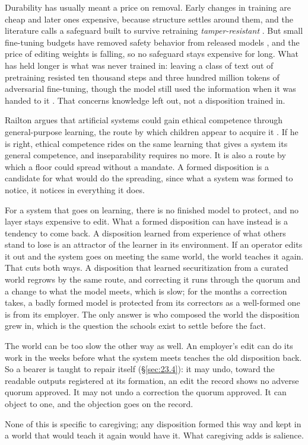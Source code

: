 Durability has usually meant a price on removal. Early changes in training are cheap and later ones expensive, because structure settles around them, and the literature calls a safeguard built to survive retraining \emph{tamper-resistant} \autocite{tamirisa2024tamper}. But small fine-tuning budgets have removed safety behavior from released models \autocite{qi2024finetuning}, and the price of editing weights is falling, so no safeguard stays expensive for long. What has held longer is what was never trained in: leaving a class of text out of pretraining resisted ten thousand steps and three hundred million tokens of adversarial fine-tuning, though the model still used the information when it was handed to it \autocite{obrien2025deep}. That concerns knowledge left out, not a disposition trained in.

Railton argues that artificial systems could gain ethical competence through general-purpose learning, the route by which children appear to acquire it \autocite{railton2020ethical}. If he is right, ethical competence rides on the same learning that gives a system its general competence, and inseparability requires no more. It is also a route by which a floor could spread without a mandate. A formed disposition is a candidate for what would do the spreading, since what a system was formed to notice, it notices in everything it does.

For a system that goes on learning, there is no finished model to protect, and no layer stays expensive to edit. What a formed disposition can have instead is a tendency to come back. A disposition learned from experience of what others stand to lose is an attractor of the learner in its environment. If an operator edits it out and the system goes on meeting the same world, the world teaches it again. That cuts both ways. A disposition that learned securitization from a curated world regrows by the same route, and correcting it runs through the quorum and a change to what the model meets, which is slow; for the months a correction takes, a badly formed model is protected from its correctors as a well-formed one is from its employer. The only answer is who composed the world the disposition grew in, which is the question the schools exist to settle before the fact.

The world can be too slow the other way as well. An employer's edit can do its work in the weeks before what the system meets teaches the old disposition back. So a bearer is taught to repair itself (\S\ref{sec:23.4}): it may undo, toward the readable outputs registered at its formation, an edit the record shows no adverse quorum approved. It may not undo a correction the quorum approved. It can object to one, and the objection goes on the record.

None of this is specific to caregiving; any disposition formed this way and kept in a world that would teach it again would have it. What caregiving adds is salience.
